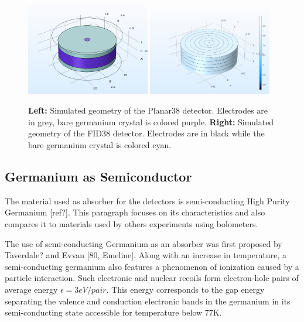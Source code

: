 \begin{figure}
\centering
\includegraphics[width=0.48\textwidth]{Figures/Electrodes/planar38_3d.png}
\includegraphics[width=0.48\textwidth]{Figures/Electrodes/fid38_3d.png}
\caption{
\textbf{Left:} Simulated geometry of the Planar38 detector. Electrodes are in grey, bare germanium crystal is colored purple.
\textbf{Right:} Simulated geometry of the FID38 detector. Electrodes are in black while the bare germanium crystal is colored cyan.
}
\label{fig:reference-design-3d}
\end{figure}

\subsection{Germanium as Semiconductor}

The material used as absorber for the detectors is semi-conducting High Purity Germanium [ref?].
This paragraph focuses on its characteristics and also compares it to materials used by others experiments using bolometers.

The use of semi-conducting Germanium as an absorber was first proposed by Taverdale? and Evvan [80, Emeline].
Along with an increase in temperature, a semi-conducting germanium also features a phenomenon of ionization caused by a particle interaction. Such electronic and nuclear recoils form electron-hole pairs of average energy $\epsilon = 3 eV/pair$. This energy corresponds to the gap energy separating the valence and conduction electronic bands in the germanium in its semi-conducting state accessible for temperature below 77K.

